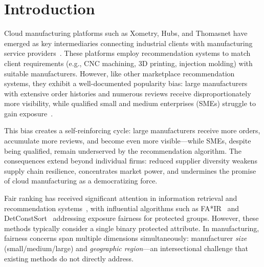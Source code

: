 \documentclass[sigconf,natbib=true]{acmart}
\begin{document}


\maketitle

\section{Introduction}
\label{sec:intro}

Cloud manufacturing platforms such as Xometry, Hubs, and Thomasnet have emerged as key intermediaries connecting industrial clients with manufacturing service providers~\cite{lu2020cloud}. These platforms employ recommendation systems to match client requirements (e.g., CNC machining, 3D printing, injection molding) with suitable manufacturers. However, like other marketplace recommendation systems, they exhibit a well-documented popularity bias: large manufacturers with extensive order histories and numerous reviews receive disproportionately more visibility, while qualified small and medium enterprises (SMEs) struggle to gain exposure~\cite{zheng2022cloud}.

This bias creates a self-reinforcing cycle: large manufacturers receive more orders, accumulate more reviews, and become even more visible---while SMEs, despite being qualified, remain underserved by the recommendation algorithm. The consequences extend beyond individual firms: reduced supplier diversity weakens supply chain resilience, concentrates market power, and undermines the promise of cloud manufacturing as a democratizing force.

Fair ranking has received significant attention in information retrieval and recommendation systems~\cite{ekstrand2022fairness}, with influential algorithms such as FA*IR~\cite{zehlike2017fair} and DetConstSort~\cite{geyik2019fairness} addressing exposure fairness for protected groups. However, these methods typically consider a single binary protected attribute. In manufacturing, fairness concerns span multiple dimensions simultaneously: manufacturer \emph{size} (small/medium/large) and \emph{geographic region}---an intersectional challenge that existing methods do not directly address.
\end{document}
